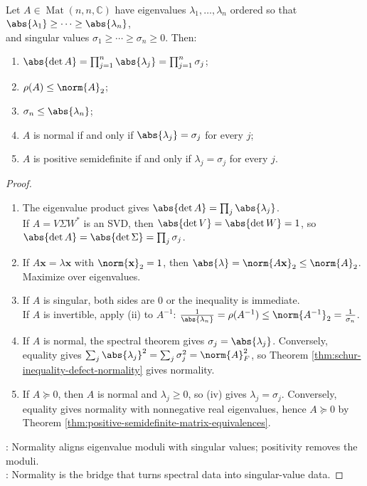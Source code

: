 \begin{theorem} \label{thm:eigenvalues-versus-singular-values} \\
Let $A\in\operatorname{Mat}(n,n,\mathbb{C})$ have eigenvalues $\lambda_1,\ldots,\lambda_n$ ordered so that $\abs{\lambda_1}\geq\cdots\geq\abs{\lambda_n}$,\\
and singular values $\sigma_1\geq\cdots\geq\sigma_n\geq0$. Then:
\begin{enumerate}[label=(\roman*)]
\setlength{\itemsep}{0pt}
\item $\abs{\det A}=\prod_{j=1}^{n}\abs{\lambda_j}=\prod_{j=1}^{n}\sigma_j$;
\item $\rho(A)\leq\norm{A}_2$;
\item $\sigma_n\leq\abs{\lambda_n}$;
\item $A$ is normal if and only if $\abs{\lambda_j}=\sigma_j$ for every $j$;
\item $A$ is positive semidefinite if and only if $\lambda_j=\sigma_j$ for every $j$.
\end{enumerate}
\begin{proof}
\begin{enumerate}[label=(\roman*)]
\setlength{\itemsep}{0pt}
\item The eigenvalue product gives $\abs{\det A}=\prod_j\abs{\lambda_j}$.\\
If $A=V\Sigma W^*$ is an SVD, then $\abs{\det V}=\abs{\det W}=1$, so $\abs{\det A}=\abs{\det\Sigma}=\prod_j\sigma_j$.
\item If $A\mathbf{x}=\lambda\mathbf{x}$ with $\norm{\mathbf{x}}_2=1$, then $\abs{\lambda}=\norm{A\mathbf{x}}_2\leq\norm{A}_2$. Maximize over eigenvalues.
\item If $A$ is singular, both sides are $0$ or the inequality is immediate.\\
If $A$ is invertible, apply (ii) to $A^{-1}$: $\frac{1}{\abs{\lambda_n}}=\rho(A^{-1})\leq\norm{A^{-1}}_2=\frac{1}{\sigma_n}$.
\item If $A$ is normal, the spectral theorem gives $\sigma_j=\abs{\lambda_j}$. Conversely, equality gives $\sum_j\abs{\lambda_j}^2=\sum_j\sigma_j^2=\norm{A}_F^2$, so Theorem \ref{thm:schur-inequality-defect-normality} gives normality.
\item If $A\succeq0$, then $A$ is normal and $\lambda_j\geq0$, so (iv) gives $\lambda_j=\sigma_j$. Conversely, equality gives normality with nonnegative real eigenvalues, hence $A\succeq0$ by Theorem \ref{thm:positive-semidefinite-matrix-equivalences}.
\end{enumerate}
: Normality aligns eigenvalue moduli with singular values; positivity removes the moduli.\\
: Normality is the bridge that turns spectral data into singular-value data.
\end{proof}
\end{theorem}

